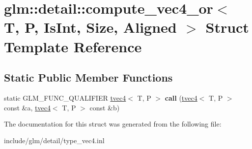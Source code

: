 \hypertarget{structglm_1_1detail_1_1compute__vec4__or}{}\section{glm\+:\+:detail\+:\+:compute\+\_\+vec4\+\_\+or$<$ T, P, Is\+Int, Size, Aligned $>$ Struct Template Reference}
\label{structglm_1_1detail_1_1compute__vec4__or}
\subsection*{Static Public Member Functions}
\begin{DoxyCompactItemize}
\item 
\mbox{\label{structglm_1_1detail_1_1compute__vec4__or_a8ecf1e09438d479204235fb4df04c9bb}} 
static G\+L\+M\+\_\+\+F\+U\+N\+C\+\_\+\+Q\+U\+A\+L\+I\+F\+I\+ER \hyperlink{structglm_1_1tvec4}{tvec4}$<$ T, P $>$ {\bfseries call} (\hyperlink{structglm_1_1tvec4}{tvec4}$<$ T, P $>$ const \&a, \hyperlink{structglm_1_1tvec4}{tvec4}$<$ T, P $>$ const \&b)
\end{DoxyCompactItemize}


The documentation for this struct was generated from the following file\+:\begin{DoxyCompactItemize}
\item 
include/glm/detail/type\+\_\+vec4.\+inl\end{DoxyCompactItemize}
